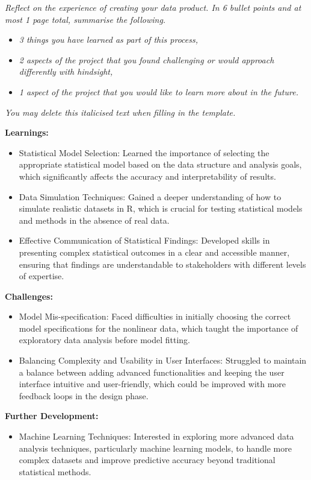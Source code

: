 \documentclass[a4paper, 12pt]{article}
\begin{document}
\textit{Reflect on the experience of creating your data product. In 6 bullet points and at most 1 page total, summarise the following.} 

\begin{itemize}
    \item \textit{3 things you have learned as part of this process,}
    \item \textit{2 aspects of the project that you found challenging or would approach differently with hindsight,} 
    \item \textit{1 aspect of the project that you would like to learn more about in the future.}
\end{itemize}

\textit{You may delete this italicised text when filling in the template.} 

\textbf{Learnings:}

\begin{itemize}
    \item Statistical Model Selection: Learned the importance of selecting the appropriate statistical model based on the data structure and analysis goals, which significantly affects the accuracy and interpretability of results.
    \item Data Simulation Techniques: Gained a deeper understanding of how to simulate realistic datasets in R, which is crucial for testing statistical models and methods in the absence of real data.
    \item Effective Communication of Statistical Findings: Developed skills in presenting complex statistical outcomes in a clear and accessible manner, ensuring that findings are understandable to stakeholders with different levels of expertise.
\end{itemize}

\textbf{Challenges:}

\begin{itemize}
    \item Model Mis-specification: Faced difficulties in initially choosing the correct model specifications for the nonlinear data, which taught the importance of exploratory data analysis before model fitting.
    \item Balancing Complexity and Usability in User Interfaces: Struggled to maintain a balance between adding advanced functionalities and keeping the user interface intuitive and user-friendly, which could be improved with more feedback loops in the design phase.
\end{itemize}

\textbf{Further Development:}

\begin{itemize}
    \item Machine Learning Techniques: Interested in exploring more advanced data analysis techniques, particularly machine learning models, to handle more complex datasets and improve predictive accuracy beyond traditional statistical methods.
\end{itemize}
\end{document}
